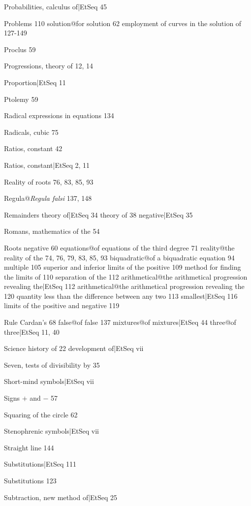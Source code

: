 \documentclass[12pt]{book}[2005/09/16]
\newcommand{\PageSep}[1]{\ignorespaces}
\begin{document}
Probabilities, calculus of|EtSeq 45 %

Problems 110
  solution@for solution 62
  employment of curves in the solution of 127-149

Proclus 59

Progressions, theory of 12, 14

Proportion|EtSeq 11 %

Ptolemy 59

Radical expressions in equations 134

Radicals, cubic 75

Ratios, constant 42

Ratios, constant|EtSeq 2, 11 %

Reality of roots 76, 83, 85, 93

Regula@\textit{Regula falsi} 137, 148

Remainders
  theory of|EtSeq 34 %
  theory of 38
  negative|EtSeq 35 %

Romans, mathematics of the 54

Roots
  negative 60
  equations@of equations of the third degree 71
  reality@the reality of the 74, 76, 79, 83, 85, 93
  biquadratic@of a biquadratic equation 94
  multiple 105
  superior and inferior limits of the positive 109
  method for finding the limits of 110
  separation of the 112
  arithmetical@the arithmetical progression revealing the|EtSeq 112 %
  arithmetical@the arithmetical progression revealing the 120
  quantity less than the difference between any two 113
  smallest|EtSeq 116 %
  limits of the positive and negative 119

Rule
  Cardan's 68
  false@of false 137
  mixtures@of mixtures|EtSeq 44 %
  three@of three|EtSeq 11, 40 %
\PageSep{156}

Science
  history of 22
  development of|EtSeq vii %

Seven, tests of divisibility by 35

Short-mind symbols|EtSeq vii %

Signs $+$ and $-$ 57

Squaring of the circle 62

Stenophrenic symbols|EtSeq vii %

Straight line 144

Substitutions|EtSeq 111 %

Substitutions 123

Subtraction, new method of|EtSeq 25 %
\end{document}
